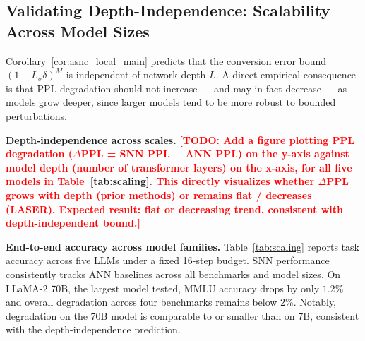 \documentclass{article}
\theoremstyle{plain}
\theoremstyle{definition}
\theoremstyle{remark}
\begin{document}
\subsection{Validating Depth-Independence: Scalability Across Model Sizes}
\label{subsec:exp_scale}

Corollary~\ref{cor:asnc_local_main} predicts that the conversion error bound
$(1 + L_\sigma\delta)^M$ is independent of network depth $L$. A direct empirical
consequence is that PPL degradation should not increase — and may in fact decrease —
as models grow deeper, since larger models tend to be more robust to bounded
perturbations.

\noindent\textbf{Depth-independence across scales.}
\textcolor{red}{\textbf{[TODO: Add a figure plotting PPL degradation ($\Delta$PPL =
SNN PPL $-$ ANN PPL) on the y-axis against model depth (number of transformer layers)
on the x-axis, for all five models in Table~\ref{tab:scaling}. This directly
visualizes whether $\Delta$PPL grows with depth (prior methods) or remains flat /
decreases (LASER). Expected result: flat or decreasing trend, consistent with
depth-independent bound.]}}

\noindent\textbf{End-to-end accuracy across model families.}
Table~\ref{tab:scaling} reports task accuracy across five LLMs under a fixed 16-step
budget. SNN performance consistently tracks ANN baselines across all benchmarks and
model sizes. On LLaMA-2 70B, the largest model tested, MMLU accuracy drops by only
$1.2\%$ and overall degradation across four benchmarks remains below $2\%$. Notably,
degradation on the 70B model is comparable to or smaller than on 7B, consistent with
the depth-independence prediction.
\end{document}
